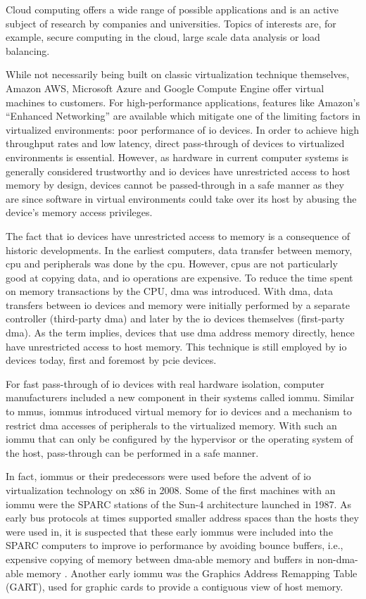 Cloud computing offers a wide range of possible applications and is an active
subject of research by companies and universities. Topics of interests are, for
example, secure computing in the cloud, large scale data analysis or load
balancing.

While not necessarily being built on classic virtualization technique
themselves, Amazon AWS, Microsoft Azure and Google Compute Engine offer virtual
machines to customers. For high-performance applications, features like Amazon's
``Enhanced Networking'' are available which mitigate one of the limiting factors
in virtualized environments: poor performance of \acs{io} devices. In order to
achieve high throughput rates and low latency, direct pass-through of devices to
virtualized environments is essential. However, as hardware in current computer
systems is generally considered trustworthy and \ac{io} devices have
unrestricted access to host memory by design, devices cannot be passed-through
in a safe manner as they are since software in virtual environments could take
over its host by abusing the device's memory access privileges.

The fact that \ac{io} devices have unrestricted access to memory is a
consequence of historic developments. In the earliest computers, data transfer
between memory, \acs{cpu} and peripherals was done by the \ac{cpu}. However,
\acp{cpu} are not particularly good at copying data, and \ac{io} operations are
expensive. To reduce the time spent on memory transactions by the CPU, \ac{dma}
was introduced. With \ac{dma}, data transfers between \ac{io} devices and memory
were initially performed by a separate controller (third-party \ac{dma}) and
later by the \ac{io} devices themselves (first-party \ac{dma}). As the term
implies, devices that use \ac{dma} address memory directly, hence have
unrestricted access to host memory. This technique is still employed by \ac{io}
devices today, first and foremost by \acs{pcie} devices.

For fast pass-through of \ac{io} devices with real hardware isolation, computer
manufacturers included a new component in their systems called \acf{iommu}.
Similar to \acp{mmu}, \acp{iommu} introduced virtual memory for \ac{io} devices
and a mechanism to restrict \ac{dma} accesses of peripherals to the virtualized
memory. With such an \ac{iommu} that can only be configured by the hypervisor
or the operating system of the host, pass-through can be performed in a safe
manner.

In fact, \acp{iommu} or their predecessors were used before the advent of
\ac{io} virtualization technology on x86 in 2008. Some of the first machines
with an \ac{iommu} were the SPARC stations of the Sun-4 architecture launched in
1987. As early bus protocols at times supported smaller address spaces than the
hosts they were used in, it is suspected that these early \acp{iommu} were
included into the SPARC computers to improve \ac{io} performance by avoiding
bounce buffers, i.e., expensive copying of memory between \ac{dma}-able memory
and buffers in non-\ac{dma}-able memory
\cite[pp.~28~ff.]{rothwell2018exploitation}. Another early \ac{iommu} was the
Graphics Address Remapping Table (GART), used for graphic cards to provide a
contiguous view of host memory.

